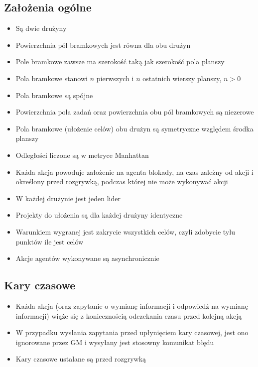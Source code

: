 \documentclass[Dokumentacja.tex]{subfiles}
\begin{document}
\subsection{Założenia ogólne}
\begin{itemize}
    \item Są dwie drużyny
    \item Powierzchnia pól bramkowych jest równa dla obu drużyn
    \item Pole bramkowe zawsze ma szerokość taką jak szerokość pola planszy
    \item Pola bramkowe stanowi $n$ pierwszych i $n$ ostatnich wierszy planszy, $n > 0$
    \item Pola bramkowe są spójne
    \item Powierzchnia pola zadań oraz powierzchnia obu pól bramkowych są niezerowe
    \item Pola bramkowe (ułożenie celów) obu drużyn są symetryczne względem środka planszy
    \item Odległości liczone są w metryce Manhattan
    \item Każda akcja powoduje założenie na agenta blokady, na czas zależny od akcji i określony przed rozgrywką, podczas której nie może wykonywać akcji
    \item W każdej drużynie jest jeden lider
    \item Projekty do ułożenia są dla każdej drużyny identyczne
    \item Warunkiem wygranej jest zakrycie wszystkich celów, czyli zdobycie tylu punktów ile jest celów
    \item Akcje agentów wykonywane są asynchronicznie
\end{itemize}
\subsection{Kary czasowe}
\begin{itemize}
    \item Każda akcja (oraz zapytanie o wymianę informacji i odpowiedź na wymianę informacji)
    wiąże się z koniecznością odczekania czasu przed kolejną akcją
    \item W przypadku wysłania zapytania przed upłynięciem kary czasowej, jest ono ignorowane przez GM i wysyłany jest stosowny komunikat błędu
    \item Kary czasowe ustalane są przed rozgrywką
\end{itemize}
\end{document}
